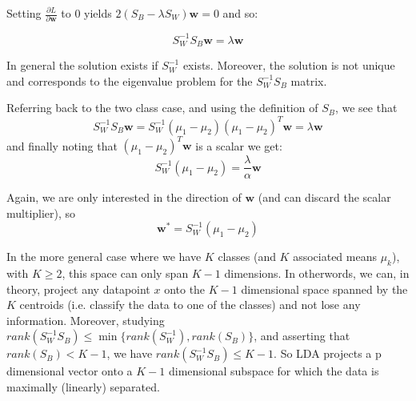 \documentclass{article}
\begin{document}
Setting $\frac{\partial L}{\partial \mathbf{w}}$ to $0$ yields $2(S_B - \lambda S_W)\mathbf{w} = 0$ and so:

\begin{equation}
  S_W^{-1}S_B \mathbf{w} = \lambda \mathbf{w}
\end{equation}

In general the solution exists if $S_W^{-1}$ exists. Moreover, the solution is not unique and corresponds to the eigenvalue problem for the $S_W^{-1}S_B$ matrix.

Referring back to the two class case, and using the definition of $S_B$, we see that
$$
S_W^{-1}S_B \mathbf{w} = S_W^{-1}(\mu_1 - \mu_2)(\mu_1 - \mu_2)^T \mathbf{w} = \lambda \mathbf{w}
$$and finally noting that $(\mu_1 - \mu_2)^T \mathbf{w}$ is a scalar we get:
\begin{equation}
  S_W^{-1} (\mu_1 - \mu_2) = \frac{\lambda}{\alpha} \mathbf{w}
\end{equation}

Again, we are only interested in the direction of $\mathbf{w}$ (and can discard the scalar multiplier), so
$$
\mathbf{w^*} = S_W^{-1} (\mu_1 - \mu_2)
$$

In the more general case where we have $K$ classes (and $K$ associated means $\mu_k$), with $K \geq 2$, this space can only span $K-1$ dimensions. In otherwords, we can, in theory, project any datapoint $x$ onto the $K-1$ dimensional space spanned by the $K$ centroids (i.e. classify the data to one of the classes) and not lose any information. Moreover, studying $rank(S_W^{-1}S_B) \leq \min\{ rank(S_W^{-1}), rank(S_B) \}$, \cite{petersen2008matrix} and asserting that $rank(S_B) < K-1$, we have $rank(S_W^{-1}S_B) \leq K-1$. So LDA projects a p dimensional vector onto a $K-1$ dimensional subspace for which the data is maximally (linearly) separated.

\end{document}

